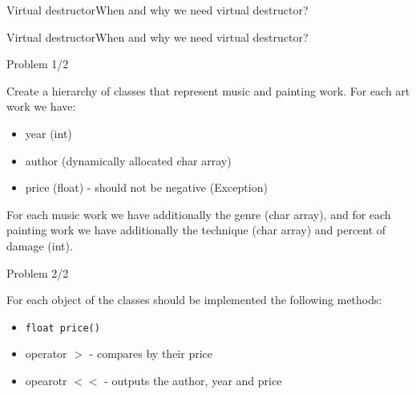 
\begin{frame}[fragile]{Virtual destructor}{When and why we need virtual
destructor?}

\end{frame}

\begin{frame}[fragile]{Virtual destructor}{When and why we need virtual
destructor?}

\end{frame}

\begin{frame}{Problem 1/2}
\begin{scriptsize}
Create a hierarchy of classes that represent music and painting work. 
For each art work we have:
\begin{itemize}
  \item year (int)
  \item author (dynamically allocated char array)
  \item price (float) - should not be negative (Exception)
\end{itemize}
For each music work we have additionally the genre (char array), and for each
painting work we have additionally the technique (char array) and percent of
damage (int).

\end{scriptsize}
\end{frame}

\begin{frame}{Problem 2/2}
\begin{scriptsize}
For each object of the classes should be implemented the following methods:
\begin{itemize}
  \item \texttt{float price()}
  \begin{itemize}
   \end{itemize}
   \item operator $>$ - compares by their price
   \item opearotr $<<$ - outputs the author, year and price
\end{itemize}

\end{scriptsize}
\end{frame}

